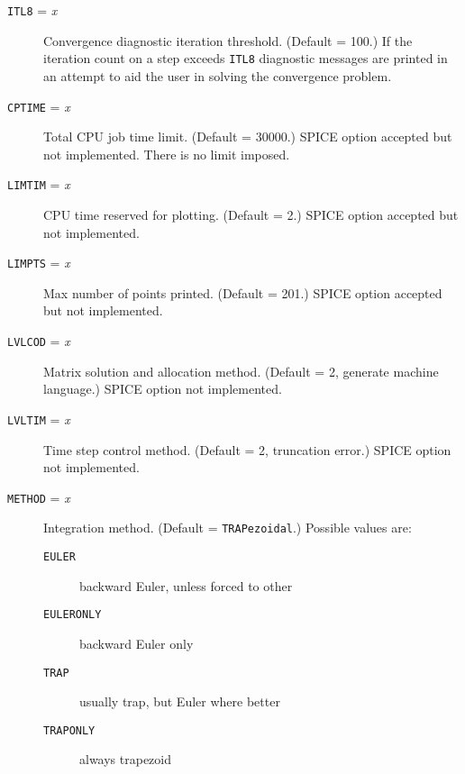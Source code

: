 \begin{description}
\item[{\tt ITL8} = {\it x}] Convergence diagnostic iteration threshold.
(Default = 100.)  If the iteration count on a step exceeds {\tt ITL8}
diagnostic messages are printed in an attempt to aid the user in solving the
convergence problem.

\item[{\tt CPTIME} = {\it x}] Total CPU job time limit.
(Default = 30000.)  SPICE option accepted but not implemented.
There is no limit imposed.

\item[{\tt LIMTIM} = {\it x}] CPU time reserved for plotting.
(Default = 2.)  SPICE option accepted but not implemented.

\item[{\tt LIMPTS} = {\it x}] Max number of points printed.
(Default = 201.)  SPICE option accepted but not implemented.

\item[{\tt LVLCOD} = {\it x}] Matrix solution and allocation
method.  (Default = 2, generate machine language.)  SPICE
option not implemented.

\item[{\tt LVLTIM} = {\it x}] Time step control method.
(Default = 2, truncation error.)  SPICE option not implemented.

\item[{\tt METHOD} = {\it x}] Integration method.  (Default =
{\tt TRAPezoidal}.)  Possible values are:
\begin{description}
\item[{\tt EULER}] backward Euler, unless forced to other
\item[{\tt EULERONLY}] backward Euler only
\item[{\tt TRAP}] usually trap, but Euler where better
\item[{\tt TRAPONLY}] always trapezoid
\end{description}


\end{description}
